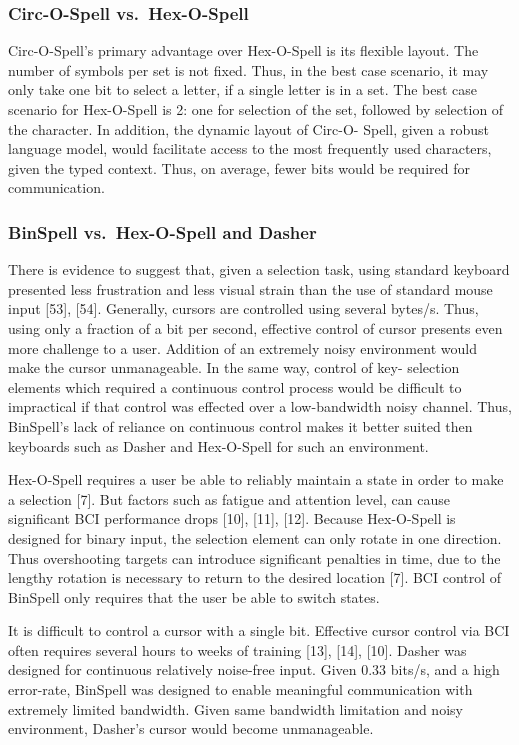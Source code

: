 \documentclass[12pt,titlepage]{article}
\begin{document}
\subsubsection{Circ-O-Spell vs.\ Hex-O-Spell}

Circ-O-Spell's primary advantage over Hex-O-Spell is its flexible layout.  The number of 
symbols per set is not fixed.  Thus, in the best case scenario, it may only take one bit to select a 
letter, if a single letter is in a set.  The best case scenario for Hex-O-Spell is 2: one for selection 
of the set, followed by selection of the character.  In addition, the dynamic layout of Circ-O- 
Spell, given a robust language model, would facilitate access to the most frequently used 
characters, given the typed context.  Thus, on average, fewer bits would be required for 
communication.

\subsubsection{BinSpell vs.\ Hex-O-Spell and Dasher}

There is evidence to suggest that, given a selection task, using standard keyboard  presented 
less frustration and less visual strain than the use of standard mouse input [53], [54].  Generally, 
cursors are controlled using several bytes/s.  Thus, using only a fraction of a bit per second, 
effective control of cursor presents even more challenge to a user.  Addition of an extremely 
noisy environment would make the cursor unmanageable.  In the same way, control of key- 
selection elements which required a continuous control process would be difficult to 
impractical if that control was effected over a low-bandwidth noisy channel.  Thus, BinSpell's 
lack of reliance on continuous control makes it better suited then keyboards such as Dasher and 
Hex-O-Spell for such an environment.

Hex-O-Spell requires a user be able to reliably maintain a state in order to make a selection [7]. 
But factors such as fatigue and attention level, can cause significant BCI performance 
drops [10], [11], [12].  Because Hex-O-Spell is designed for binary input, the selection element 
can only rotate in one direction.  Thus overshooting targets can introduce significant penalties 
in time, due to the  lengthy rotation is necessary to return to the desired location [7].  BCI 
control of BinSpell only requires that the user be able to switch states.

It is difficult to control a cursor with a single bit.  Effective cursor control via BCI often 
requires several hours to weeks of training [13], [14], [10].  Dasher was designed for continuous
relatively noise-free input.  Given $0.33$ bits/s, and a high error-rate,  BinSpell was designed to 
enable meaningful communication with extremely limited bandwidth.  Given same bandwidth 
limitation and noisy environment, Dasher's cursor would become unmanageable.
\end{document}
